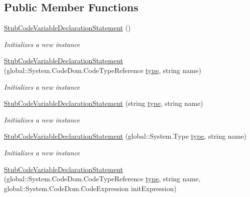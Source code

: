 \subsection*{Public Member Functions}
\begin{DoxyCompactItemize}
\item 
\hyperlink{class_system_1_1_code_dom_1_1_fakes_1_1_stub_code_variable_declaration_statement_a41fd576ac1d5160d2db06713903a5eeb}{Stub\-Code\-Variable\-Declaration\-Statement} ()
\begin{DoxyCompactList}\small\item\em Initializes a new instance\end{DoxyCompactList}\item 
\hyperlink{class_system_1_1_code_dom_1_1_fakes_1_1_stub_code_variable_declaration_statement_a8abc24dd45b6502a8ee9a926e2473d50}{Stub\-Code\-Variable\-Declaration\-Statement} (global\-::\-System.\-Code\-Dom.\-Code\-Type\-Reference \hyperlink{jquery-1_810_82-vsdoc_8js_a3940565e83a9bfd10d95ffd27536da91}{type}, string name)
\begin{DoxyCompactList}\small\item\em Initializes a new instance\end{DoxyCompactList}\item 
\hyperlink{class_system_1_1_code_dom_1_1_fakes_1_1_stub_code_variable_declaration_statement_a4390df3c593870d718fda6e061b59b3b}{Stub\-Code\-Variable\-Declaration\-Statement} (string \hyperlink{jquery-1_810_82-vsdoc_8js_a3940565e83a9bfd10d95ffd27536da91}{type}, string name)
\begin{DoxyCompactList}\small\item\em Initializes a new instance\end{DoxyCompactList}\item 
\hyperlink{class_system_1_1_code_dom_1_1_fakes_1_1_stub_code_variable_declaration_statement_a02adc76c2dbba77ba481b7c23ecb622f}{Stub\-Code\-Variable\-Declaration\-Statement} (global\-::\-System.\-Type \hyperlink{jquery-1_810_82-vsdoc_8js_a3940565e83a9bfd10d95ffd27536da91}{type}, string name)
\begin{DoxyCompactList}\small\item\em Initializes a new instance\end{DoxyCompactList}\item 
\hyperlink{class_system_1_1_code_dom_1_1_fakes_1_1_stub_code_variable_declaration_statement_a7f7ff0114e6740b618bd1cbe9b3f33b2}{Stub\-Code\-Variable\-Declaration\-Statement} (global\-::\-System.\-Code\-Dom.\-Code\-Type\-Reference \hyperlink{jquery-1_810_82-vsdoc_8js_a3940565e83a9bfd10d95ffd27536da91}{type}, string name, global\-::\-System.\-Code\-Dom.\-Code\-Expression init\-Expression)

\end{DoxyCompactItemize}
